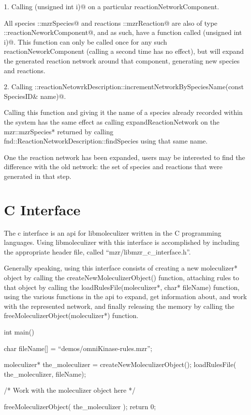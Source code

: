 1.  Calling \lstinline@expandReactionNetwork(unsigned int i)@ on a particular
reactionNetworkComponent.

All species \lstinline@mzr::mzrSpecies@ and reactions \lstinline@mzr::mzrReaction@ are
also of type \lstinline@fnd::reactionNeworkComponent@, and as such, have a function
called \lstinline@expandReactionNetwork(unsigned int i)@.  This function can only
be called once for any such reactionNeworkComponent (calling a second
time has no effect), but will expand the generated reaction network
around that component, generating new species and reactions.


2.  Calling
\lstinline@fnd::reactionNetowrkDescription::incrementNetworkBySpeciesName(const SpeciesID& name)@.  

Calling this function and giving it the name of a species already
recorded within the system has the same effect as calling
expandReactionNetwork on the mzr::mzrSpecies* returned by calling
fnd::ReactionNetworkDescription::findSpecies using that same name. 

One the reaction network has been expanded, users may be interested to
find the difference with the old network: the set of species and
reactions that were generated in that step.  


\section{C Interface}
The c interface is an api for libmoleculizer written in the C
programming languages.  Using libmoleculizer with this interface is
accomplished by including the appropriate header file, called
``mzr/libmzr\_c\_interface.h''. 

Generally speaking, using this interface consists of creating a new
moleculizer* object by calling the createNewMoleculizerObject()
function, attaching rules to that object by calling the
loadRulesFile(moleculizer*, char* fileName) function, using the
various functions in the api to expand, get information about, and
work with the represented network, and finally releasing the memory by
calling the freeMoleculizerObject(moleculizer*) function.  

\begin{ExampleC}[caption=Basic example using the c-interface]
  int main(){
    char fileName[] = ``demos/omniKinase-rules.mzr'';
    
    moleculizer* the_moleculizer = createNewMoleculizerObject();
    loadRulesFile( the_moleculizer, fileName);

    /* Work with the moleculizer object here */

    freeMoleculizerObject( the_moleculizer );
    return 0;
    }
\end{ExampleC}

